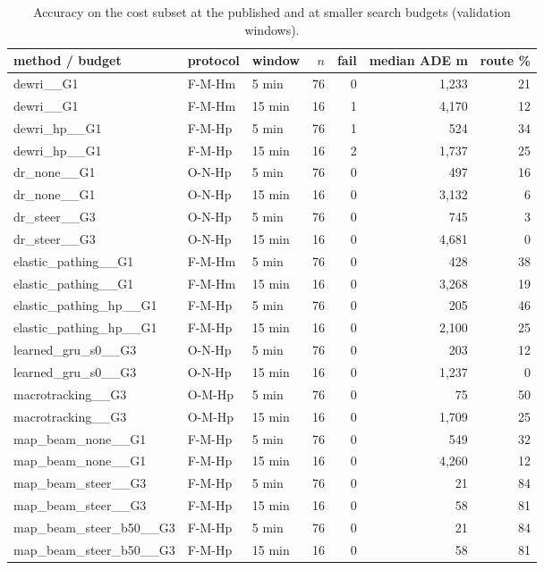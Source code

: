\begin{table}[t]\centering\scriptsize\setlength{\tabcolsep}{3pt}
\caption{Accuracy on the cost subset at the published and at smaller search budgets (validation windows).}\label{tab:supp_cost_acc}
\begin{tabular}{lllrrrr}\toprule
method / budget & protocol & window & $n$ & fail & median ADE m & route \% \\\midrule
dewri\_\_G1 & F-M-Hm & 5 min & 76 & 0 & 1{,}233 & 21 \\
dewri\_\_G1 & F-M-Hm & 15 min & 16 & 1 & 4{,}170 & 12 \\
dewri\_hp\_\_G1 & F-M-Hp & 5 min & 76 & 1 & 524 & 34 \\
dewri\_hp\_\_G1 & F-M-Hp & 15 min & 16 & 2 & 1{,}737 & 25 \\
dr\_none\_\_G1 & O-N-Hp & 5 min & 76 & 0 & 497 & 16 \\
dr\_none\_\_G1 & O-N-Hp & 15 min & 16 & 0 & 3{,}132 & 6 \\
dr\_steer\_\_G3 & O-N-Hp & 5 min & 76 & 0 & 745 & 3 \\
dr\_steer\_\_G3 & O-N-Hp & 15 min & 16 & 0 & 4{,}681 & 0 \\
elastic\_pathing\_\_G1 & F-M-Hm & 5 min & 76 & 0 & 428 & 38 \\
elastic\_pathing\_\_G1 & F-M-Hm & 15 min & 16 & 0 & 3{,}268 & 19 \\
elastic\_pathing\_hp\_\_G1 & F-M-Hp & 5 min & 76 & 0 & 205 & 46 \\
elastic\_pathing\_hp\_\_G1 & F-M-Hp & 15 min & 16 & 0 & 2{,}100 & 25 \\
learned\_gru\_s0\_\_G3 & O-N-Hp & 5 min & 76 & 0 & 203 & 12 \\
learned\_gru\_s0\_\_G3 & O-N-Hp & 15 min & 16 & 0 & 1{,}237 & 0 \\
macrotracking\_\_G3 & O-M-Hp & 5 min & 76 & 0 & 75 & 50 \\
macrotracking\_\_G3 & O-M-Hp & 15 min & 16 & 0 & 1{,}709 & 25 \\
map\_beam\_none\_\_G1 & F-M-Hp & 5 min & 76 & 0 & 549 & 32 \\
map\_beam\_none\_\_G1 & F-M-Hp & 15 min & 16 & 0 & 4{,}260 & 12 \\
map\_beam\_steer\_\_G3 & F-M-Hp & 5 min & 76 & 0 & 21 & 84 \\
map\_beam\_steer\_\_G3 & F-M-Hp & 15 min & 16 & 0 & 58 & 81 \\
map\_beam\_steer\_b50\_\_G3 & F-M-Hp & 5 min & 76 & 0 & 21 & 84 \\
map\_beam\_steer\_b50\_\_G3 & F-M-Hp & 15 min & 16 & 0 & 58 & 81 \\

\end{tabular}
\end{table}
